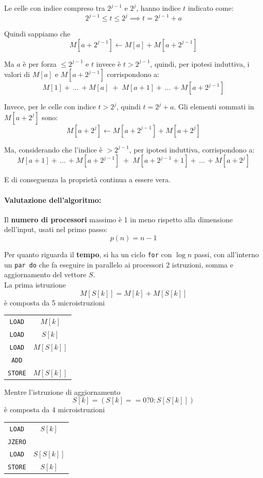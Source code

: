 \documentclass[11pt]{article}
\begin{document}
\begin{enumerate}
\begin{itemize}
			Le celle con indice compreso tra $2^{j-1}$ e $2^j$, hanno indice $t$ indicato come:
			$$ 2^{j-1} \leq t \leq 2^j \implies t = 2^{j-1} + a$$
			
			Quindi sappiamo che 
			$$ M[a + 2^{j-1}] \leftarrow M [a] + M[a + 2^{j-1}]$$
			
			Ma $a$ è per forza $\leq 2^{j-1}$ e $t$ invece è $t > 2^{j-1}$, quindi, per ipotesi induttiva, i valori di $M [a]$ e $M[a + 2^{j-1}]$ corrispondono a:
			$$ M[1] + \, ...\, + M[a] \; + \; M[a+1] + \, ... \, + M[a+2^{j-1}] $$
			
			Invece, per le celle con indice $t > 2^j$, quindi $t = 2^j + a$. Gli elementi sommati in $M[a + 2^j]$ sono: 
			$$ M[a + 2^j] \leftarrow M[a + 2^{j-1}] + M[a + 2^j] $$
			
			Ma, considerando che l'indice è $> 2^{j-1}$, per ipotesi induttiva, corrispondono a:
			$$ M[a + 1] + \, ... \, + M[a + 2^{j-1}] \; + \; M[a + 2^{j-1} + 1] + \, ... \, + M[a + 2^j] $$
			
			E di conseguenza la proprietà continua a essere vera.
		\end{itemize}
	\end{enumerate}
	
	
	\newpage
	
	\paragraph{Valutazione dell'algoritmo:} Il \textbf{numero di processori} massimo è 1 in meno rispetto alla dimensione dell'input, usati nel primo passo:
	$$ p(n) = n-1 $$
	
	Per quanto riguarda il \textbf{tempo}, si ha un ciclo \texttt{for} con $\log n$ passi, con all'interno un \texttt{par do} che fa eseguire in parallelo ai processori 2 istruzioni, somma e aggiornamento del vettore $S$.\\
	La prima istruzione
	$$ M[S[k]] = M[k] + M[S[k]] $$
	è composta da 5 microistruzioni
	\begin{center}
		\begin{tabular}{c c}
			\texttt{LOAD} & $M[k]$ \\
			\texttt{LOAD} & $S[k]$ \\
			\texttt{LOAD} & $M[S[k]]$ \\
			\texttt{ADD} & \\
			\texttt{STORE} & $M[S[k]]$ \\
		\end{tabular}
	\end{center}
	Mentre l'istruzione di aggiornamento
	$$ S[k] = (S[k]==0 ? 0 : S[S[k]]) $$
	è composta da 4 microistruzioni
	\begin{center}
		\begin{tabular}{c c}
			\texttt{LOAD} & $S[k]$ \\
			\texttt{JZERO} & \\
			\texttt{LOAD} & $S[S[k]]$ \\
			\texttt{STORE} & $S[k]$
		\end{tabular}
	\end{center}
	
\end{document}
